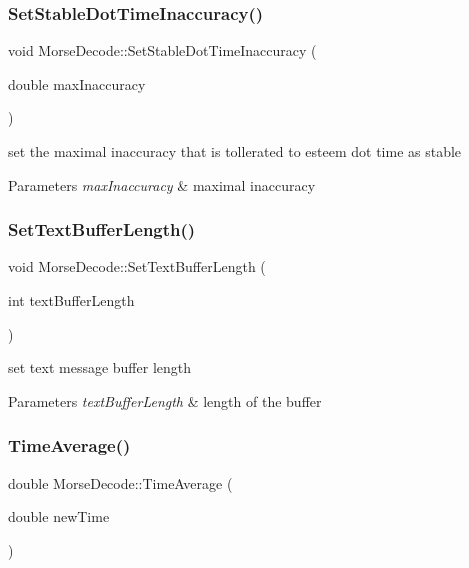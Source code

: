 \subsubsection{\texorpdfstring{Set\+Stable\+Dot\+Time\+Inaccuracy()}{SetStableDotTimeInaccuracy()}}
{\footnotesize\ttfamily void Morse\+Decode\+::\+Set\+Stable\+Dot\+Time\+Inaccuracy (\begin{DoxyParamCaption}\item[{double}]{max\+Inaccuracy }\end{DoxyParamCaption})}



set the maximal inaccuracy that is tollerated to esteem dot time as stable 


\begin{DoxyParams}{Parameters}
{\em max\+Inaccuracy} & maximal inaccuracy \\
\hline
\end{DoxyParams}
\mbox{\label{classMorseDecode_a53d7aedff642bc7b0111454bf32678fb}} 
\subsubsection{\texorpdfstring{Set\+Text\+Buffer\+Length()}{SetTextBufferLength()}}
{\footnotesize\ttfamily void Morse\+Decode\+::\+Set\+Text\+Buffer\+Length (\begin{DoxyParamCaption}\item[{int}]{text\+Buffer\+Length }\end{DoxyParamCaption})}



set text message buffer length 


\begin{DoxyParams}{Parameters}
{\em text\+Buffer\+Length} & length of the buffer \\
\hline
\end{DoxyParams}
\mbox{\label{classMorseDecode_a40976ef94b368d713808e26cefd2ea60}} 
\subsubsection{\texorpdfstring{Time\+Average()}{TimeAverage()}}
{\footnotesize\ttfamily double Morse\+Decode\+::\+Time\+Average (\begin{DoxyParamCaption}\item[{double}]{new\+Time }\end{DoxyParamCaption})\hspace{0.3cm}{\ttfamily [private]}}



